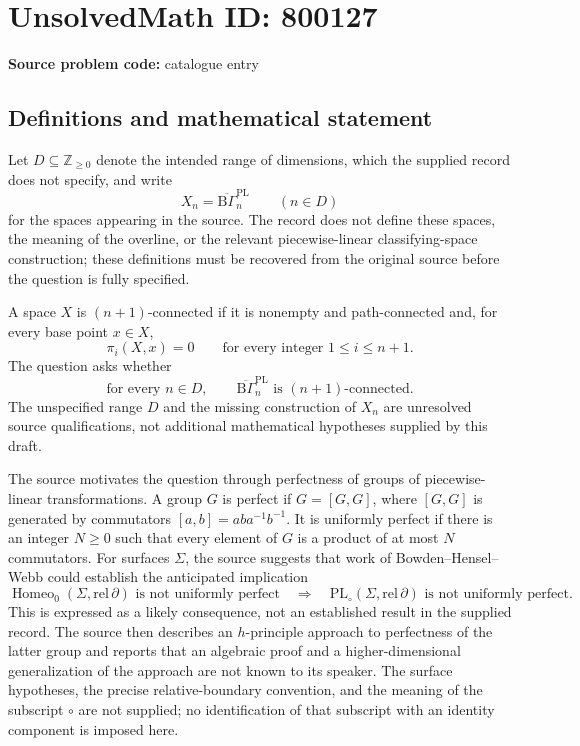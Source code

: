 \documentclass[11pt]{article}
\newcommand{\Z}{\mathbb{Z}}
\begin{document}
\section*{UnsolvedMath ID: 800127}
\textbf{Source problem code:} catalogue entry
\subsection{Definitions and mathematical statement}
Let \(D\subseteq\Z_{\geq 0}\) denote the intended range of dimensions, which the supplied record does not specify, and write
\[
X_n=\overline{\mathrm{B}\Gamma}_n^{\mathrm{PL}}\qquad(n\in D)
\]
for the spaces appearing in the source. The record does not define these spaces, the meaning of the overline, or the relevant piecewise-linear classifying-space construction; these definitions must be recovered from the original source before the question is fully specified.

A space \(X\) is \((n+1)\)-connected if it is nonempty and path-connected and, for every base point \(x\in X\),
\[
\pi_i(X,x)=0\qquad\text{for every integer }1\leq i\leq n+1.
\]
The question asks whether
\[
\text{for every }n\in D,\qquad
\overline{\mathrm{B}\Gamma}_n^{\mathrm{PL}}
\text{ is }(n+1)\text{-connected}.
\]
The unspecified range \(D\) and the missing construction of \(X_n\) are unresolved source qualifications, not additional mathematical hypotheses supplied by this draft.

The source motivates the question through perfectness of groups of piecewise-linear transformations. A group \(G\) is perfect if \(G=[G,G]\), where \([G,G]\) is generated by commutators \([a,b]=aba^{-1}b^{-1}\). It is uniformly perfect if there is an integer \(N\geq 0\) such that every element of \(G\) is a product of at most \(N\) commutators. For surfaces \(\Sigma\), the source suggests that work of Bowden--Hensel--Webb could establish the anticipated implication
\[
\operatorname{Homeo}_0(\Sigma,\mathrm{rel}\,\partial)
\text{ is not uniformly perfect}
\quad\Longrightarrow\quad
\mathrm{PL}_{\circ}(\Sigma,\mathrm{rel}\,\partial)
\text{ is not uniformly perfect}.
\]
This is expressed as a likely consequence, not an established result in the supplied record. The source then describes an \(h\)-principle approach to perfectness of the latter group and reports that an algebraic proof and a higher-dimensional generalization of the approach are not known to its speaker. The surface hypotheses, the precise relative-boundary convention, and the meaning of the subscript \(\circ\) are not supplied; no identification of that subscript with an identity component is imposed here.
\end{document}
